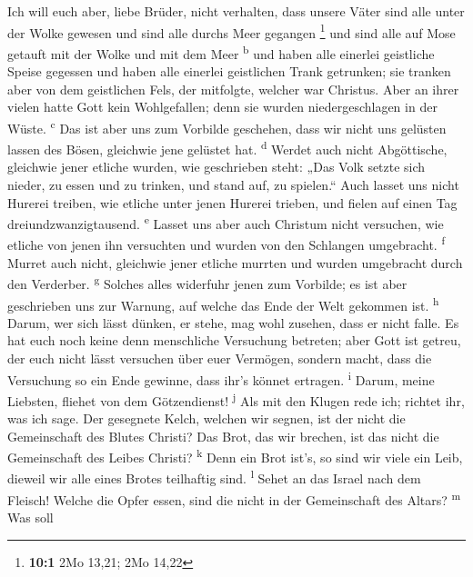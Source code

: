  Ich will euch aber, liebe Brüder, nicht verhalten, dass
unsere Väter sind alle unter der Wolke gewesen und sind alle durchs Meer
gegangen \footnote{\textbf{10:1} 2Mo 13,21; 2Mo 14,22} 
und sind alle auf Mose getauft mit der Wolke und mit dem Meer
\textsuperscript{b}  und haben alle einerlei geistliche
Speise gegessen  und haben alle einerlei geistlichen Trank
getrunken; sie tranken aber von dem geistlichen Fels, der mitfolgte,
welcher war Christus.  Aber an ihrer vielen hatte Gott
kein Wohlgefallen; denn sie wurden niedergeschlagen in der Wüste.
\textsuperscript{c}  Das ist aber uns zum Vorbilde
geschehen, dass wir nicht uns gelüsten lassen des Bösen, gleichwie jene
gelüstet hat. \textsuperscript{d}  Werdet auch nicht
Abgöttische, gleichwie jener etliche wurden, wie geschrieben steht: „Das
Volk setzte sich nieder, zu essen und zu trinken, und stand auf, zu
spielen.``  Auch lasset uns nicht Hurerei treiben, wie
etliche unter jenen Hurerei trieben, und fielen auf einen Tag
dreiundzwanzigtausend. \textsuperscript{e}  Lasset uns
aber auch Christum nicht versuchen, wie etliche von jenen ihn versuchten
und wurden von den Schlangen umgebracht. \textsuperscript{f}
 Murret auch nicht, gleichwie jener etliche murrten und
wurden umgebracht durch den Verderber. \textsuperscript{g}
 Solches alles widerfuhr jenen zum Vorbilde; es ist aber
geschrieben uns zur Warnung, auf welche das Ende der Welt gekommen ist.
\textsuperscript{h}  Darum, wer sich lässt dünken, er
stehe, mag wohl zusehen, dass er nicht falle.  Es hat
euch noch keine denn menschliche Versuchung betreten; aber Gott ist
getreu, der euch nicht lässt versuchen über euer Vermögen, sondern
macht, dass die Versuchung so ein Ende gewinne, dass ihr's könnet
ertragen. \textsuperscript{i}  Darum, meine Liebsten,
fliehet von dem Götzendienst! \textsuperscript{j}  Als
mit den Klugen rede ich; richtet ihr, was ich sage.  Der
gesegnete Kelch, welchen wir segnen, ist der nicht die Gemeinschaft des
Blutes Christi? Das Brot, das wir brechen, ist das nicht die
Gemeinschaft des Leibes Christi? \textsuperscript{k} 
Denn ein Brot ist's, so sind wir viele ein Leib, dieweil wir alle eines
Brotes teilhaftig sind. \textsuperscript{l}  Sehet an das
Israel nach dem Fleisch! Welche die Opfer essen, sind die nicht in der
Gemeinschaft des Altars? \textsuperscript{m}  Was soll

